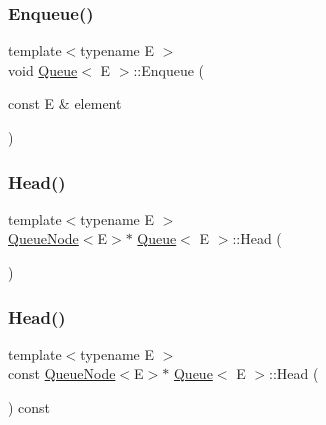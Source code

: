 \mbox{\label{classQueue_abaa2e7175457307bca74f5562cbdaaa9}} 
\subsubsection{\texorpdfstring{Enqueue()}{Enqueue()}}
{\footnotesize\ttfamily template$<$typename E $>$ \\
void \hyperlink{classQueue}{Queue}$<$ E $>$\+::Enqueue (\begin{DoxyParamCaption}\item[{const E \&}]{element }\end{DoxyParamCaption})\hspace{0.3cm}{\ttfamily [inline]}}

\mbox{\label{classQueue_a71aa0154ef75bb87a53b6af1829fcd5e}} 
\subsubsection{\texorpdfstring{Head()}{Head()}\hspace{0.1cm}{\footnotesize\ttfamily [1/2]}}
{\footnotesize\ttfamily template$<$typename E $>$ \\
\hyperlink{classQueueNode}{Queue\+Node}$<$E$>$$\ast$ \hyperlink{classQueue}{Queue}$<$ E $>$\+::Head (\begin{DoxyParamCaption}{ }\end{DoxyParamCaption})\hspace{0.3cm}{\ttfamily [inline]}}

\mbox{\label{classQueue_a6c906075e0ad2d1f0634990aa106395e}} 
\subsubsection{\texorpdfstring{Head()}{Head()}\hspace{0.1cm}{\footnotesize\ttfamily [2/2]}}
{\footnotesize\ttfamily template$<$typename E $>$ \\
const \hyperlink{classQueueNode}{Queue\+Node}$<$E$>$$\ast$ \hyperlink{classQueue}{Queue}$<$ E $>$\+::Head (\begin{DoxyParamCaption}{ }\end{DoxyParamCaption}) const\hspace{0.3cm}{\ttfamily [inline]}}

